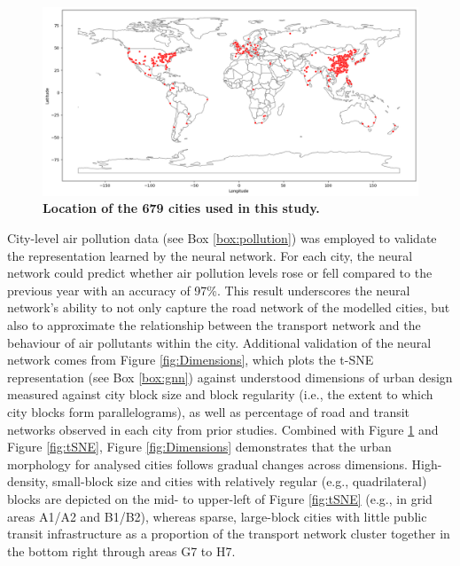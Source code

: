 \documentclass[preprint,10pt]{elsarticle} %
\begin{document}
\begin{figure}
\centering
\includegraphics[trim={0 0 0 0},clip,scale=0.4]{Images/ByCountry_map_Black.png}
\caption{\bf Location of the 679 cities used in this study.}
 \label{fig:clusters}
\end{figure}

City-level air pollution data (see Box \ref{box:pollution}) was employed to validate the representation learned by the neural network. For each city, the neural network could predict whether air pollution levels rose or fell compared to the previous year with an accuracy of 97\%. This result underscores the neural network's ability to not only capture the road network of the modelled cities, but also to approximate the relationship between the transport network and the behaviour of air pollutants within the city. Additional validation of the neural network comes from Figure \ref{fig:Dimensions}, which plots the t-SNE representation (see Box \ref{box:gnn}) against understood dimensions of urban design measured against city block size and block regularity (i.e., the extent to which city blocks form parallelograms), as well as percentage of road and transit networks observed in each city from prior studies\cite{Thompson2020,Nice2019b}. Combined with Figure \ref{fig:clusters} and Figure \ref{fig:tSNE}, Figure \ref{fig:Dimensions} demonstrates that the urban morphology for analysed cities follows gradual changes across dimensions. High-density, small-block size and cities with relatively regular (e.g., quadrilateral) blocks are depicted on the mid- to upper-left of Figure \ref{fig:tSNE} (e.g., in grid areas A1/A2 and B1/B2), whereas sparse, large-block cities with little public transit infrastructure as a proportion of the transport network cluster together in the bottom right through areas G7 to H7. 
\end{document}
